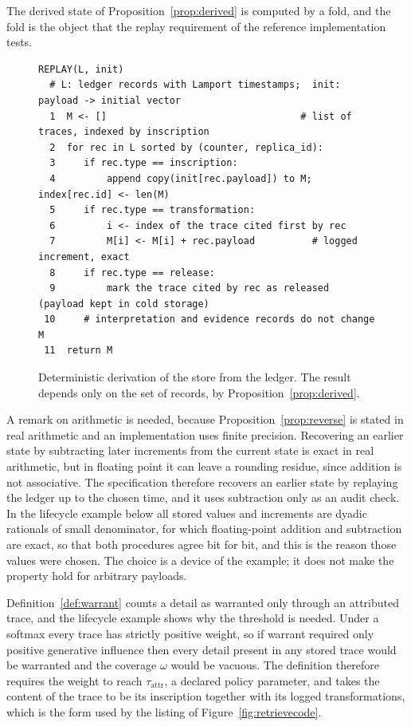 The derived state of Proposition~\ref{prop:derived} is computed by a fold, and the fold is the object that the replay requirement of the reference implementation tests.

\begin{figure}[t]
\centering
\begin{Verbatim}[fontsize=\footnotesize,frame=single,framesep=2mm]
REPLAY(L, init)
  # L: ledger records with Lamport timestamps;  init: payload -> initial vector
  1  M <- []                                  # list of traces, indexed by inscription
  2  for rec in L sorted by (counter, replica_id):
  3     if rec.type == inscription:
  4         append copy(init[rec.payload]) to M;  index[rec.id] <- len(M)
  5     if rec.type == transformation:
  6         i <- index of the trace cited first by rec
  7         M[i] <- M[i] + rec.payload          # logged increment, exact
  8     if rec.type == release:
  9         mark the trace cited by rec as released (payload kept in cold storage)
 10     # interpretation and evidence records do not change M
 11  return M
\end{Verbatim}
\caption{Deterministic derivation of the store from the ledger. The result depends only on the set of records, by Proposition~\ref{prop:derived}.}\label{fig:replaycode}
\end{figure}

A remark on arithmetic is needed, because Proposition~\ref{prop:reverse} is stated in real arithmetic and an implementation uses finite precision. Recovering an earlier state by subtracting later increments from the current state is exact in real arithmetic, but in floating point it can leave a rounding residue, since addition is not associative. The specification therefore recovers an earlier state by replaying the ledger up to the chosen time, and it uses subtraction only as an audit check. In the lifecycle example below all stored values and increments are dyadic rationals of small denominator, for which floating-point addition and subtraction are exact, so that both procedures agree bit for bit, and this is the reason those values were chosen. The choice is a device of the example; it does not make the property hold for arbitrary payloads.

Definition~\ref{def:warrant} counts a detail as warranted only through an attributed trace, and the lifecycle example shows why the threshold is needed. Under a softmax every trace has strictly positive weight, so if warrant required only positive generative influence then every detail present in any stored trace would be warranted and the coverage $\omega$ would be vacuous. The definition therefore requires the weight to reach $\tau_{\mathrm{attr}}$, a declared policy parameter, and takes the content of the trace to be its inscription together with its logged transformations, which is the form used by the listing of Figure~\ref{fig:retrievecode}.


